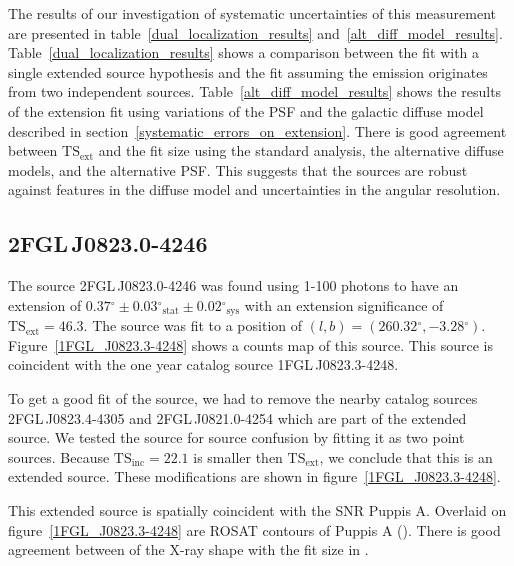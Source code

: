 \documentclass[12pt,preprint]{aastex}
\newcommand{\gev}{\text{GeV}\xspace}
\newcommand{\tsext}{{\ensuremath{\text{TS}_{\text{ext}}}}\xspace}
\newcommand{\tsinc}{\ensuremath{\text{TS}_{\text{inc}}}\xspace}
\newcommand{\sys}{\text{sys}\xspace}
\newcommand{\stat}{\text{stat}\xspace}
\renewcommand{\deg}{\ensuremath{^\circ}\xspace}
\begin{document}
The results of our investigation of systematic uncertainties of this
measurement are presented in table~\ref{dual_localization_results}
and~\ref{alt_diff_model_results}.  Table~\ref{dual_localization_results}
shows a comparison between the fit with a single extended source
hypothesis and the fit assuming the emission originates from two
independent sources.  Table~\ref{alt_diff_model_results} shows the
results of the extension fit using variations of the PSF and the galactic
diffuse model described in section~\ref{systematic_errors_on_extension}.
There is good agreement between \tsext and the fit size using
the standard analysis, the alternative diffuse models, and the alternative PSF.
This suggests that the sources are robust against features in the diffuse
model and uncertainties in the angular resolution.

\subsection{2FGL\,J0823.0-4246}
\label{section_2FGL_J0823.0-4246}


The source 2FGL\,J0823.0-4246 was found 
using 1-100 \gev photons to have an 
extension of $0.37\deg\pm0.03\deg_\stat\pm0.02\deg_\sys$ 
with an extension
significance of $\tsext=46.3$.  The source was fit to a position of
$(l,b)=(260.32\deg,-3.28\deg)$.  Figure~\ref{1FGL_J0823.3-4248} shows a
counts map of this source.  This source is coincident with the one year
catalog source 1FGL\,J0823.3-4248.

To get a good fit of the source, we had to remove the nearby catalog
sources 2FGL\,J0823.4-4305 and 2FGL\,J0821.0-4254 which are part of the
extended source.  We tested the source for source confusion by fitting
it as two point sources. Because $\tsinc=22.1$ is smaller then \tsext,
we conclude that this is an extended source.  These modifications are
shown in figure~\ref{1FGL_J0823.3-4248}.

This extended source is spatially coincident with the SNR Puppis A.
Overlaid on figure~\ref{1FGL_J0823.3-4248} are ROSAT contours of Puppis
A (\cite{rosat_puppis_a}). There is good agreement between of the X-ray
shape with the fit size in \gev.

\end{document}
